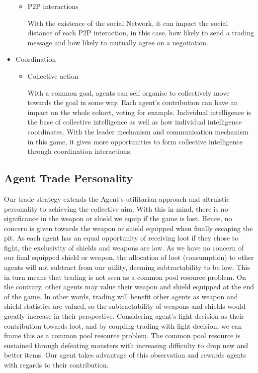 \begin{itemize}
\begin{itemize}
\begin{flushleft}
                \end{flushleft}
        \item P2P interactions
                \begin{flushleft}
                \setlength{\parindent}{2em}
                With the existence of the social Network, it can impact the social distance of each P2P interaction, in this case, how likely to send a trading message and how likely to mutually agree on a negotiation. 
                \end{flushleft}
    \end{itemize}
  \item Coordination
    \begin{itemize}
        \item Collective action
                \begin{flushleft}
                \setlength{\parindent}{2em}
                With a common goal, agents can self organise to collectively move towards the goal in some way. Each agent's contribution can have an impact on the whole cohort, voting for example. Individual intelligence is the base of collective intelligence as well as how individual intelligence coordinates. With the leader mechanism and communication mechanism in this game, it gives more opportunities to form collective intelligence through coordination interactions.
                \end{flushleft}
    \end{itemize}
\end{itemize}



\subsection{Agent Trade Personality}

\noindent Our trade strategy extends the Agent’s utilitarian approach and altruistic personality to achieving the collective aim. With this in mind, there is no significance in the weapon or shield we equip if the game is lost. Hence, no concern is given towards the weapon or shield equipped when finally escaping the pit. As each agent has an equal opportunity of receiving loot if they chose to fight, the exclusivity of shields and weapons are low. As we have no concern of our final equipped shield or weapon, the allocation of loot (consumption) to other agents will not subtract from our utility, deeming subtractability to be low. This in turn means that trading is not seen as a common pool resource problem.
\noindent On the contrary, other agents may value their weapon and shield equipped at the end of the game. In other words, trading will benefit other agents as weapon and shield statistics are valued, so the subtractability of weapons and shields would greatly increase in their perspective.
Considering agent’s fight decision as their contribution towards loot, and by coupling trading with fight decision, we can frame this as a common pool resource problem. The common pool resource is sustained through defeating monsters with increasing difficulty to drop new and better items. Our agent takes advantage of this observation and rewards agents with regards to their contribution.

